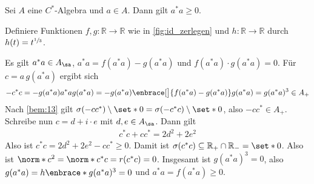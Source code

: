 \begin{satz}[label=satz:36,{name=[$a^*a$ ist positiv]}]
	Sei $A$ eine $C^*$-Algebra und $a \in A$. Dann gilt $a^*a \ge 0$.
\end{satz}
\begin{beweis}
	Definiere Funktionen $f,g \colon \mathbb{R} \to \mathbb{R}$ wie in \cref{fig:id_zerlegen} und $h \colon \mathbb{R} \to \mathbb{R}$ durch $h(t)=t^{\sfrac{1}{3}}$.
	\begin{figure}[t]
	\end{figure}
	Es gilt $a^*a \in A_{\sa}$, $a^*a = f(a^*a)- g(a^*a)$ und $f(a^*a) \cdot g(a^*a)=0$. 
	Für $c=a \,g(a^*a)$ ergibt sich
	\begin{align}
		-c^*c = -g(a^*a) a^*a g(a^*a) = -g(a^*a) \enbrace[\big]{f(a^*a) - g(a^*a)} g(a^*a) = g(a^*a)^3 \in A_+
	\end{align}
	Nach \autoref{bem:13} gilt $\sigma(-cc^*) \setminus \set*{0} = \sigma(-c^*c) \setminus \set*{0}$, also $-cc^* \in A_+$. 
	Schreibe nun $c=d + i \cdot e$ mit $d,e \in A_\sa$. Dann gilt
	\begin{align}
		c^*c+cc^* = 2d^2+ 2e^2
	\end{align}
	Also ist $c^*c= 2d^2+2e^2- cc^* \ge 0$. Damit ist $\sigma(c^*c) \subseteq \mathbb{R}_+ \cap \mathbb{R}_- = \set*{0}$. 
	Also ist $\norm*{c}^2= \norm*{c^*c}= r(c^*c)=0$. 
	Insgesamt ist $g(a^*a)^3=0$, also $g(a^*a)=h \enbrace*{g(a^*a)^3}=0$ und $a^*a=f(a^*a)\ge 0$.
\end{beweis}


